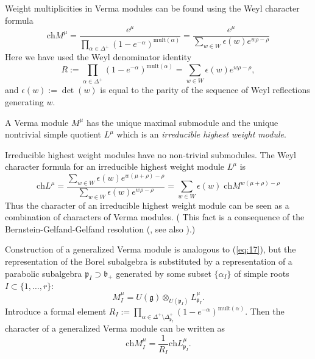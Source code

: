 \documentclass[preprint,12pt]{elsarticle}
\newcommand{\gf}{\mathfrak{g}}
\newcommand{\bff}{\mathfrak{b}}
\newcommand{\pf}{\mathfrak{p}}
\begin{document}
Weight multiplicities in Verma modules can be found using the Weyl
character formula
\begin{equation}
  \label{eq:11}
  \mathrm{ch} M^{\mu}=\frac{e^{\mu}}{\prod_{\alpha\in \Delta^{+}} \left( 1-e^{-\alpha}\right)^{\mathrm{mult}(\alpha)}}=\frac{e^{\mu}}{\sum_{w\in W} \epsilon(w) e^{w\rho-\rho}}
\end{equation}
Here we have used the Weyl denominator identity
\begin{equation}
  \label{eq:12}
  R:=\prod_{\alpha\in \Delta^{+}} \left( 1-e^{-\alpha}\right)^{\mathrm{mult}(\alpha)}=\sum_{w\in W} \epsilon(w) e^{w\rho-\rho},
\end{equation}
and $\epsilon \left( w\right) :=\det \left( w\right)$ is equal to 
the parity of the sequence of Weyl reflections generating $w$.

A Verma module $M^{\mu}$ has the unique maximal submodule and the
unique nontrivial simple quotient $L^{\mu}$ which is an
{\it irreducible highest weight module}. 

Irreducible highest weight modules have no non-trivial submodules. 
The Weyl character formula for an irreducible highest weight module $L^{\mu}$ is
\begin{equation}
  \label{eq:13}
  \mathrm{ch} L^{\mu}=\frac{\sum_{w\in W} \epsilon(w) e^{w(\mu+\rho)-\rho}}{\sum_{w\in W}\epsilon(w) e^{w\rho-\rho}}=\sum_{w\in W} \epsilon(w)\; \mathrm{ch} M^{w(\mu+\rho)-\rho}
\end{equation}
Thus the character of an irreducible highest weight module can be
seen as a combination of characters of Verma modules. ( This
fact is a consequence of the Bernstein-Gelfand-Gelfand resolution
(\cite{bernstein1976category,bernstein1971structure}, see also
\cite{humphreys2008representations}).)

Construction of a generalized Verma module is analogous to (\ref{eq:17}), but the representation of the Borel subalgebra is substituted by a representation of a parabolic subalgebra $\pf_{I}\supset \bff_{+}$ generated by some subset $\{\alpha_{I}\}$ of simple roots $I\subset \{1,\dots, r\}$:
\begin{equation*}
M_{I}^{\mu}=U\left( \gf\right)\otimes _{U\left( \pf_{I}\right) }L_{\pf_{I}}^{\mu}.
\end{equation*}
Introduce a formal element $R_{I}:=\prod_{\alpha \in \Delta
^{+}\setminus \Delta _{\pf_{I}}^{+}}\left( 1-e^{-\alpha }\right)
^{\mathrm{mult}(\alpha )}$. Then the character of a generalized
Verma module can be written as
\begin{equation}
  \label{eq:18}
  \mathrm{ch}M_{I}^{\mu}=\frac{1}{R_{I}}\mathrm{ch}L_{\pf_{I}}^{\mu }.
\end{equation}
\end{document}
